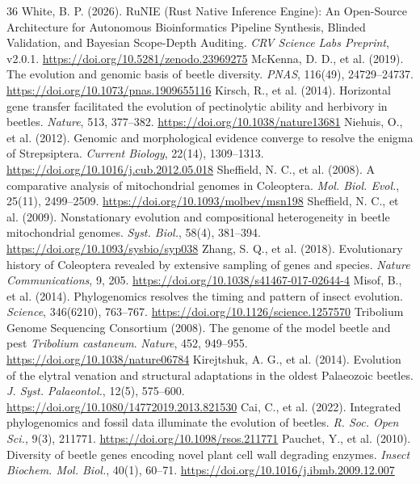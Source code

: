 \documentclass[10pt,letterpaper]{article}
\begin{document}
\begin{thebibliography}{36}
 White, B. P. (2026). RuNIE (Rust Native Inference Engine): An Open-Source Architecture for Autonomous Bioinformatics Pipeline Synthesis, Blinded Validation, and Bayesian Scope-Depth Auditing. \textit{CRV Science Labs Preprint}, v2.0.1. \url{https://doi.org/10.5281/zenodo.23969275}
 McKenna, D. D., et al. (2019). The evolution and genomic basis of beetle diversity. \textit{PNAS}, 116(49), 24729--24737. \url{https://doi.org/10.1073/pnas.1909655116}
 Kirsch, R., et al. (2014). Horizontal gene transfer facilitated the evolution of pectinolytic ability and herbivory in beetles. \textit{Nature}, 513, 377--382. \url{https://doi.org/10.1038/nature13681}
 Niehuis, O., et al. (2012). Genomic and morphological evidence converge to resolve the enigma of Strepsiptera. \textit{Current Biology}, 22(14), 1309--1313. \url{https://doi.org/10.1016/j.cub.2012.05.018}
 Sheffield, N. C., et al. (2008). A comparative analysis of mitochondrial genomes in Coleoptera. \textit{Mol. Biol. Evol.}, 25(11), 2499--2509. \url{https://doi.org/10.1093/molbev/msn198}
 Sheffield, N. C., et al. (2009). Nonstationary evolution and compositional heterogeneity in beetle mitochondrial genomes. \textit{Syst. Biol.}, 58(4), 381--394. \url{https://doi.org/10.1093/sysbio/syp038}
 Zhang, S. Q., et al. (2018). Evolutionary history of Coleoptera revealed by extensive sampling of genes and species. \textit{Nature Communications}, 9, 205. \url{https://doi.org/10.1038/s41467-017-02644-4}
 Misof, B., et al. (2014). Phylogenomics resolves the timing and pattern of insect evolution. \textit{Science}, 346(6210), 763--767. \url{https://doi.org/10.1126/science.1257570}
 Tribolium Genome Sequencing Consortium (2008). The genome of the model beetle and pest \textit{Tribolium castaneum}. \textit{Nature}, 452, 949--955. \url{https://doi.org/10.1038/nature06784}
 Kirejtshuk, A. G., et al. (2014). Evolution of the elytral venation and structural adaptations in the oldest Palaeozoic beetles. \textit{J. Syst. Palaeontol.}, 12(5), 575--600. \url{https://doi.org/10.1080/14772019.2013.821530}
 Cai, C., et al. (2022). Integrated phylogenomics and fossil data illuminate the evolution of beetles. \textit{R. Soc. Open Sci.}, 9(3), 211771. \url{https://doi.org/10.1098/rsos.211771}
 Pauchet, Y., et al. (2010). Diversity of beetle genes encoding novel plant cell wall degrading enzymes. \textit{Insect Biochem. Mol. Biol.}, 40(1), 60--71. \url{https://doi.org/10.1016/j.ibmb.2009.12.007}

\end{thebibliography}
\end{document}

